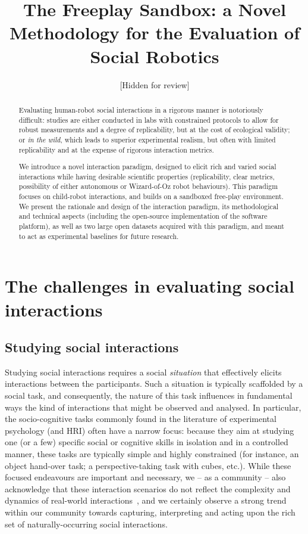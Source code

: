 \documentclass[sigconf]{acmart}
\title{The Freeplay Sandbox: a Novel Methodology for the Evaluation of Social Robotics}
\author{[Hidden for review]}
\begin{document}
\begin{abstract}

Evaluating human-robot social interactions in a rigorous manner is notoriously
difficult: studies are either conducted in labs
with constrained protocols to allow for robust measurements and a degree of
replicability, but at the cost of ecological validity; or \emph{in the wild},
which leads to superior experimental realism, but often with limited
replicability and at the expense of rigorous interaction metrics.

We introduce a novel interaction paradigm, designed to elicit rich
and varied social interactions while having desirable scientific properties
(replicability, clear metrics, possibility of either autonomous or Wizard-of-Oz
robot behaviours). This paradigm focuses on child-robot interactions, and
builds on a sandboxed free-play environment. We present the
rationale and design of the interaction paradigm, its 
methodological and technical aspects (including the open-source
implementation of the software platform), as well as two large open datasets
acquired with this paradigm, and meant to act as experimental baselines for
future research.

\end{abstract}

\maketitle

\section{The challenges in evaluating social interactions}
\label{sec:intro}

\subsection{Studying social interactions}

Studying social interactions requires a social \emph{situation} that
effectively elicits interactions between the participants. Such a situation is
typically scaffolded by a social task, and consequently, the nature of this task
influences in fundamental ways the kind of interactions that might be observed
and analysed. In particular, the socio-cognitive tasks commonly found in the
literature of experimental psychology (and HRI) often have a narrow focus:
because they aim at studying one (or a few) specific social or cognitive skills
in isolation and in a controlled manner, these tasks are typically simple and
highly constrained (for instance, an object hand-over task; a perspective-taking
task with cubes, etc.). While these focused endeavours are important and
necessary, we -- as a community -- also acknowledge that these interaction
scenarios do not reflect the complexity and dynamics of real-world
interactions~\cite{baxter2016characterising}, and we certainly observe a strong
trend within our community towards capturing, interpreting and acting upon the rich set of
naturally-occurring social interactions.
\end{document}
